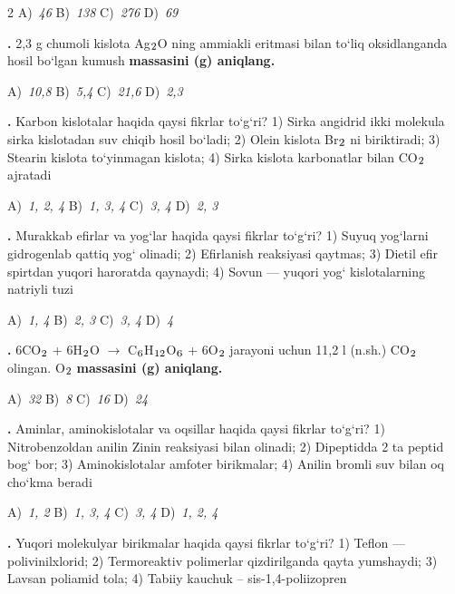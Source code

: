 \documentclass[11pt,a4paper]{article}
\renewcommand{\textsubscript}[1]{\ensuremath{_{\text{\fontsize{8}{8}\selectfont #1}}}}
\newcommand{\qn}[1]{\textbf{\fontsize{11.5}{13}\selectfont #1}}
\newcommand{\qsep}{\par\vspace{1pt}\noindent\rule{0pt}{0.4pt}\par\vspace{5pt}}
\begin{document}
\begin{multicols}{2}
\noindent A)~\textsl{46} \hfill B)~\textsl{138} \hfill C)~\textsl{276} \hfill D)~\textsl{69}\par
\qsep
\noindent\qn{24.} 2,3 g chumoli kislota Ag\textsubscript{2}O ning ammiakli eritmasi bilan to`liq oksidlanganda hosil bo`lgan kumush \textbf{massasini (g) aniqlang.}

\noindent A)~\textsl{10,8} \hfill B)~\textsl{5,4} \hfill C)~\textsl{21,6} \hfill D)~\textsl{2,3}\par
\qsep
\noindent\qn{25.} Karbon kislotalar haqida qaysi fikrlar to`g`ri? 1) Sirka angidrid ikki molekula sirka kislotadan suv chiqib hosil bo`ladi; 2) Olein kislota Br\textsubscript{2} ni biriktiradi; 3) Stearin kislota to`yinmagan kislota; 4) Sirka kislota karbonatlar bilan CO\textsubscript{2} ajratadi

\noindent A)~\textsl{1, 2, 4} \hfill B)~\textsl{1, 3, 4} \hfill C)~\textsl{3, 4} \hfill D)~\textsl{2, 3}\par
\qsep
\noindent\qn{26.} Murakkab efirlar va yog`lar haqida qaysi fikrlar to`g`ri? 1) Suyuq yog`larni gidrogenlab qattiq yog` olinadi; 2) Efirlanish reaksiyasi qaytmas; 3) Dietil efir spirtdan yuqori haroratda qaynaydi; 4) Sovun --- yuqori yog` kislotalarning natriyli tuzi

\noindent A)~\textsl{1, 4} \hfill B)~\textsl{2, 3} \hfill C)~\textsl{3, 4} \hfill D)~\textsl{4}\par
\qsep
\noindent\qn{27.} 6CO\textsubscript{2} + 6H\textsubscript{2}O $\to$ C\textsubscript{6}H\textsubscript{12}O\textsubscript{6} + 6O\textsubscript{2} jarayoni uchun 11,2 l (n.sh.) CO\textsubscript{2} olingan. O\textsubscript{2} \textbf{massasini (g) aniqlang.}

\noindent A)~\textsl{32} \hfill B)~\textsl{8} \hfill C)~\textsl{16} \hfill D)~\textsl{24}\par
\qsep
\noindent\qn{28.} Aminlar, aminokislotalar va oqsillar haqida qaysi fikrlar to`g`ri? 1) Nitrobenzoldan anilin Zinin reaksiyasi bilan olinadi; 2) Dipeptidda 2 ta peptid bog` bor; 3) Aminokislotalar amfoter birikmalar; 4) Anilin bromli suv bilan oq cho`kma beradi

\noindent A)~\textsl{1, 2} \hfill B)~\textsl{1, 3, 4} \hfill C)~\textsl{3, 4} \hfill D)~\textsl{1, 2, 4}\par
\qsep
\noindent\qn{29.} Yuqori molekulyar birikmalar haqida qaysi fikrlar to`g`ri? 1) Teflon --- polivinilxlorid; 2) Termoreaktiv polimerlar qizdirilganda qayta yumshaydi; 3) Lavsan poliamid tola; 4) Tabiiy kauchuk -- sis-1,4-poliizopren


\end{multicols}
\end{document}
